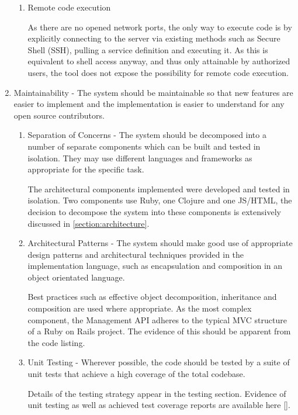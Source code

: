 \documentclass{cshonours}
\begin{document}
\begin{enumerate}
\begin{enumerate}
      \item Remote code execution

        As there are no opened network ports, the only way to execute code is by explicitly connecting to the server via existing methods such as Secure Shell (SSH), pulling a service definition and executing it. As this is equivalent to shell access anyway, and thus only attainable by authorized users, the tool does not expose the possibility for remote code execution.

    \end{enumerate}
  \item Maintainability - The system should be maintainable so that new features are easier to implement and the implementation is easier to understand for any open source contributors.

    \begin{enumerate}
      \item Separation of Concerns - The system should be decomposed into a number of separate components which can be built and tested in isolation. They may use different languages and frameworks as appropriate for the specific task.

        The architectural components implemented were developed and tested in isolation. Two components use Ruby, one Clojure and one JS/HTML, the decision to decompose the system into these components is extensively discussed in \autoref{section:architecture}.

      \item Architectural Patterns - The system should make good use of appropriate design patterns and architectural techniques provided in the implementation language, such as encapsulation and composition in an object orientated language.

        Best practices such as effective object decomposition, inheritance and composition are used where appropriate. As the most complex component, the Management API adheres to the typical MVC structure of a Ruby on Rails project. The evidence of this should be apparent from the code listing.

      \item Unit Testing - Wherever possible, the code should be tested by a suite of unit tests that achieve a high coverage of the total codebase.

        Details of the testing strategy appear in the testing section. Evidence of unit testing as well as achieved test coverage reports are available here \ref{}.


\end{enumerate}
\end{enumerate}
\end{document}
